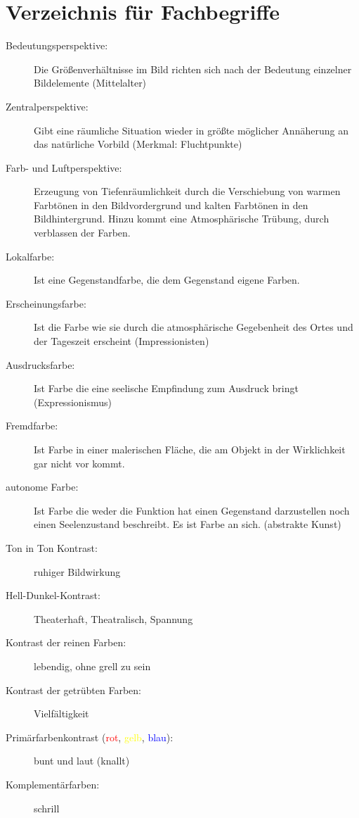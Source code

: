 \section{Verzeichnis für Fachbegriffe}
\begin{description}
	\item[Bedeutungsperspektive:] Die Größenverhältnisse im Bild richten sich nach der Bedeutung
	einzelner Bildelemente (Mittelalter)
	\item[Zentralperspektive:] Gibt eine räumliche Situation wieder in größte möglicher Annäherung
	an das natürliche Vorbild (Merkmal: Fluchtpunkte)
	\item[Farb- und Luftperspektive:] Erzeugung von Tiefenräumlichkeit durch die Verschiebung von warmen Farbtönen
	in den Bildvordergrund und kalten Farbtönen in den Bildhintergrund.
	Hinzu kommt eine Atmosphärische Trübung, durch verblassen der Farben.
	\item[Lokalfarbe:] Ist eine Gegenstandfarbe, die dem Gegenstand eigene Farben.
	\item[Erscheinungsfarbe:] Ist die Farbe wie sie durch die atmosphärische Gegebenheit
	des Ortes und der Tageszeit erscheint (Impressionisten)
	\item[Ausdrucksfarbe:] Ist Farbe die eine seelische Empfindung zum Ausdruck bringt (Expressionismus)
	\item[Fremdfarbe:] Ist Farbe in einer malerischen Fläche,
	die am Objekt in der Wirklichkeit gar nicht vor kommt.
	\item[autonome Farbe:] Ist Farbe die weder die Funktion hat einen Gegenstand darzustellen
	noch einen Seelenzustand beschreibt.
	Es ist Farbe an sich. (abstrakte Kunst)
	\item[Ton in Ton Kontrast:] ruhiger Bildwirkung
	\item[Hell-Dunkel-Kontrast:] Theaterhaft, Theatralisch, Spannung
	\item[Kontrast der reinen Farben:] lebendig, ohne grell zu sein
	\item[Kontrast der getrübten Farben:] Vielfältigkeit
	\item[Primärfarbenkontrast (\textcolor{red}{rot}, \textcolor{yellow}{gelb}, \textcolor{blue}{blau}):]
	bunt und laut (knallt)
	\item[Komplementärfarben:] schrill
\end{description}
